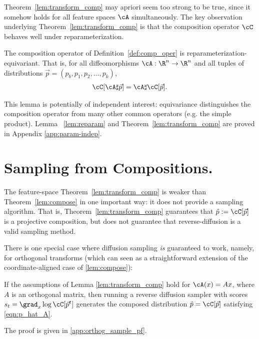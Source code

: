 Theorem~\ref{lem:transform_comp} may apriori seem too strong
to be true, since it somehow holds for all feature spaces $\cA$
simultaneously.
The key observation underlying Theorem~\ref{lem:transform_comp} 
is that the composition operator $\cC$ behaves
well under reparameterization.
\begin{lemma}
\label{lem:reparam}
The composition operator of Definition~\ref{def:comp_oper}
is reparameterization-equivariant. That is,
for all diffeomorphisms $\cA: \R^n \to \R^n$
and all tuples of distributions $\vec{p} = (p_b, p_1, p_2, \dots, p_k)$,
\begin{align}
 \cC[ \cA \sharp \vec{p}] =  \cA \sharp \cC[\vec{p}].
\end{align}
\end{lemma}

This lemma is potentially of independent interest:
equivariance distinguishes the composition operator
from many other common operators
(e.g. the simple product).
Lemma ~\ref{lem:reparam} and Theorem~\ref{lem:transform_comp}
are proved in Appendix \ref{app:param-indep}.

\section{Sampling from Compositions.}
The feature-space Theorem~\ref{lem:transform_comp} is weaker than Theorem~\ref{lem:compose}
in one important way: it does not provide a sampling algorithm.
That is, Theorem~\ref{lem:transform_comp} guarantees that $\hat{p} := \cC[\vec{p}]$
is a projective composition, but does not guarantee that reverse-diffusion
is a valid sampling method.

There is one special case where diffusion sampling \emph{is} guaranteed to work, namely, for orthogonal transforms (which can seen as a straightforward extension of the coordinate-aligned case of \cref{lem:compose}):
\begin{lemma}
\label{lem:orthogonal_sampling}
If the assumptions of Lemma \ref{lem:transform_comp} hold for $\cA(x) = Ax$, where $A$ is an orthogonal matrix, then running a reverse diffusion sampler with scores $s_t = \grad_x \log \cC[\vec{p}^t]$ generates the composed distribution $\hat{p} = \cC[\vec{p}]$ satisfying \eqref{eqn:p_hat_A}.
\end{lemma}
The proof is given in \cref{app:orthog_sample_pf}.

